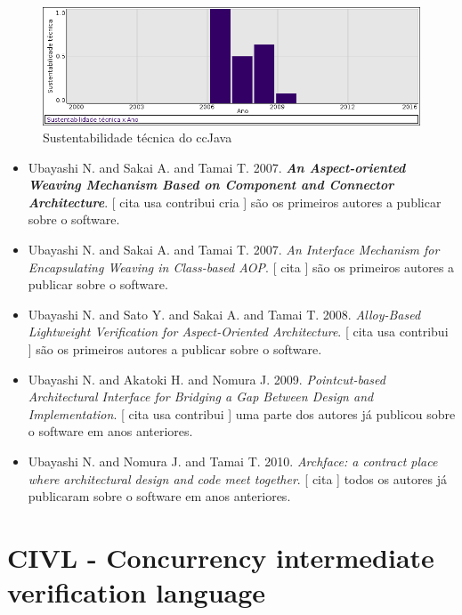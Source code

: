 \begin{figure}[h]
  \center
  \includegraphics[scale=0.50]{result-documents/charts/ccjava.png}
  \caption{Sustentabilidade técnica do ccJava}
\end{figure}


\begin{itemize}
\item Ubayashi N. and Sakai A. and Tamai T.
      2007.
        \textbf{\textit{ An Aspect-oriented Weaving Mechanism Based on Component and Connector Architecture}}.
      [
          cita
          usa
          contribui
          cria
      ]
são os primeiros autores a publicar sobre o software.
\item Ubayashi N. and Sakai A. and Tamai T.
      2007.
        \textit{ An Interface Mechanism for Encapsulating Weaving in Class-based AOP}.
      [
          cita
      ]
são os primeiros autores a publicar sobre o software.
\item Ubayashi N. and Sato Y. and Sakai A. and Tamai T.
      2008.
        \textit{ Alloy-Based Lightweight Verification for Aspect-Oriented Architecture}.
      [
          cita
          usa
          contribui
      ]
são os primeiros autores a publicar sobre o software.
\item Ubayashi N. and Akatoki H. and Nomura J.
      2009.
        \textit{ Pointcut-based Architectural Interface for Bridging a Gap Between Design and Implementation}.
      [
          cita
          usa
          contribui
      ]
uma parte dos autores já publicou sobre o software em anos anteriores.
\item Ubayashi N. and Nomura J. and Tamai T.
      2010.
        \textit{ Archface: a contract place where architectural design and code meet together}.
      [
          cita
      ]
todos os autores já publicaram sobre o software em anos anteriores.
\end{itemize}
\section{CIVL - Concurrency intermediate verification language}

